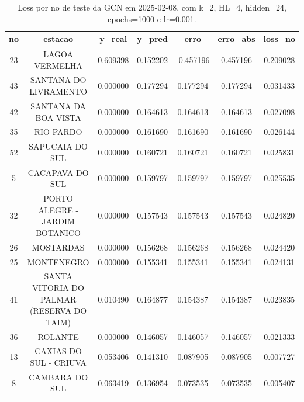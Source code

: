 \begin{table}[h]
\centering
\caption{Loss por no de teste da GCN em 2025-02-08, com k=2, HL=4, hidden=24, epochs=1000 e lr=0.001.}
\label{tab:gcn_loss_k2_hl4_h24_e1000_d20250208}
\begin{tabular}{ccccccc}
\toprule
no & estacao & y\_real & y\_pred & erro & erro\_abs & loss\_no \\
\midrule
23 & LAGOA VERMELHA & 0.609398 & 0.152202 & -0.457196 & 0.457196 & 0.209028 \\
43 & SANTANA DO LIVRAMENTO & 0.000000 & 0.177294 & 0.177294 & 0.177294 & 0.031433 \\
42 & SANTANA DA BOA VISTA & 0.000000 & 0.164613 & 0.164613 & 0.164613 & 0.027098 \\
35 & RIO PARDO & 0.000000 & 0.161690 & 0.161690 & 0.161690 & 0.026144 \\
52 & SAPUCAIA DO SUL & 0.000000 & 0.160721 & 0.160721 & 0.160721 & 0.025831 \\
5 & CACAPAVA DO SUL & 0.000000 & 0.159797 & 0.159797 & 0.159797 & 0.025535 \\
32 & PORTO ALEGRE - JARDIM BOTANICO & 0.000000 & 0.157543 & 0.157543 & 0.157543 & 0.024820 \\
26 & MOSTARDAS & 0.000000 & 0.156268 & 0.156268 & 0.156268 & 0.024420 \\
25 & MONTENEGRO & 0.000000 & 0.155341 & 0.155341 & 0.155341 & 0.024131 \\
41 & SANTA VITORIA DO PALMAR (RESERVA DO TAIM) & 0.010490 & 0.164877 & 0.154387 & 0.154387 & 0.023835 \\
36 & ROLANTE & 0.000000 & 0.146057 & 0.146057 & 0.146057 & 0.021333 \\
13 & CAXIAS DO SUL - CRIUVA & 0.053406 & 0.141310 & 0.087905 & 0.087905 & 0.007727 \\
8 & CAMBARA DO SUL & 0.063419 & 0.136954 & 0.073535 & 0.073535 & 0.005407 \\
\bottomrule
\end{tabular}
\end{table}

